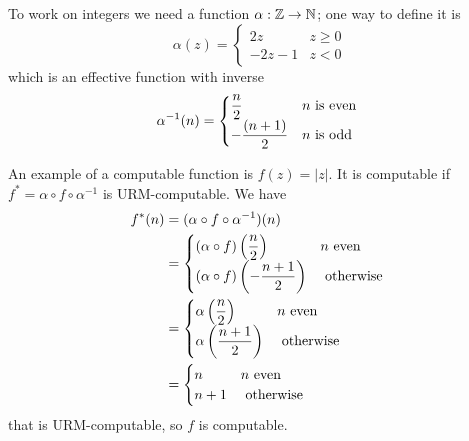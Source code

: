 \begin{example}
  To work on integers we need a function $ \alpha: \mathbb{Z} \rightarrow \mathbb{N} $; one way to define it is
  \begin{equation*}
    \alpha(z) = \begin{cases}
      2z    & z \geq 0 \\
      -2z-1 & z < 0
    \end{cases} 
  \end{equation*}
which is an effective function with inverse
\begin{equation*}
  \alpha^{-1}(n) = \begin{cases}
    \dfrac{n}{2}    & n $ is even $ \\
    -\dfrac{(n+1)}{2} & n $ is odd $
  \end{cases}
\end{equation*}

An example of a computable function is $f (z) =  |z| $. 
It is computable if $ f^*=\alpha\circ f\circ \alpha^{-1} $ is URM-computable. We have
\begin{align*}
  f^*(n) &= (\alpha\circ f\circ \alpha^{-1})(n)\\ 
         &=  
\begin{cases}
  (\alpha\circ f)\left(\dfrac{n}{2}\right) & n $ even $ \\
  (\alpha\circ f)\left(-\dfrac{n+1}{2}\right) & $ otherwise $
\end{cases}\\
&=
\begin{cases}
  \alpha\left(\dfrac{n}{2}\right) & n $ even $\\
  \alpha\left(\dfrac{n+1}{2}\right) & $ otherwise $
\end{cases}\\
&= \begin{cases}
  n   & n $ even $ \\
  n+1 & $ otherwise $
\end{cases} 
\end{align*}
that is URM-computable, so $f$ is computable.
\end{example}

